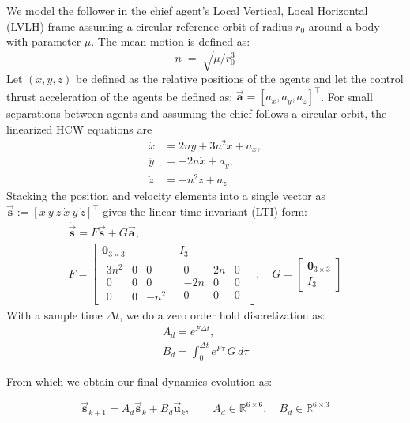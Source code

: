 We model the follower in the chief agent's Local Vertical, Local Horizontal (LVLH) frame assuming a circular reference orbit of radius $r_0$ around a body with parameter $\mu$. The mean motion is defined as:
\[
n \;=\; \sqrt{\mu / r_0^3}
\]
Let $(x,y,z)$ be defined as the relative positions of the agents and let the control thrust acceleration of the agents be defined as:
$\vec{\mathbf{a}} = [a_x, a_y, a_z]^\top$.
For small separations between agents and assuming the chief follows a circular orbit, the linearized HCW equations are
\begin{align*}
\ddot{x} &= 2n \dot{y} + 3n^2 x  + a_x, \\
\ddot{y} &= - 2n \dot{x}            + a_y, \\
\ddot{z} &= - n^2 z                  + a_z
\end{align*}
Stacking the position and velocity elements into a single vector as 
$\vec{\mathbf{s}} := [x\ y\ z\ \dot{x}\ \dot{y}\ \dot{z}]^\top$
gives the linear time invariant (LTI) form:
\begin{gather*}
\dot{\vec{\mathbf{s}}} = F\vec{\mathbf{s}} + G\vec{\mathbf{a}},\\[4pt]
F =
\begin{bmatrix}
\mathbf{0}_{3\times3} & I_3\\[4pt]
\begin{array}{ccc}
3n^2 & 0   & 0\\
0    & 0   & 0\\
0    & 0   & -n^2
\end{array} &
\begin{array}{ccc}
0 & 2n & 0\\
-2n & 0 & 0\\
0 & 0 & 0
\end{array}
\end{bmatrix},
\quad
G =
\begin{bmatrix}
\mathbf{0}_{3\times3}\\[2pt]
I_3
\end{bmatrix}
\end{gather*}
With a sample time $\Delta t$, we do a zero order hold discretization as:
\begin{gather*}
A_d = e^{F\Delta t},\\[4pt]
B_d = \int_{0}^{\Delta t} e^{F\tau}\,G\,d\tau
\end{gather*}

From which we obtain our final dynamics evolution as:


\[
\vec{\mathbf{s}}_{k+1} = A_d\vec{\mathbf{s}}_k + B_d\vec{\mathbf{u}}_k,
\qquad
A_d \in \mathbb{R}^{6\times 6},
\quad
B_d \in \mathbb{R}^{6\times 3}
\]


